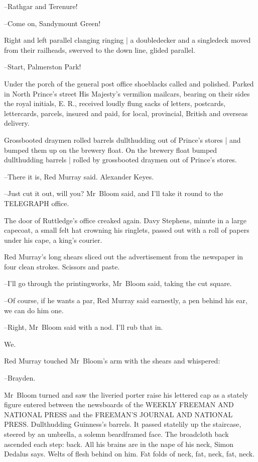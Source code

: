 --Rathgar and Terenure!

--Come on, Sandymount Green!

Right and left parallel clanging ringing |
a doubledecker and a singledeck moved from their railheads,
swerved to the down line,
glided parallel.

--Start, Palmerston Park!



Under the porch of the general post office
shoeblacks called and polished.
Parked in North Prince's street
His Majesty's vermilion mailcars,
bearing on their sides the royal initials, E. R.,
received loudly flung sacks
of letters, postcards, lettercards, parcels, insured and paid,
for local, provincial, British and overseas delivery.



Grossbooted draymen rolled barrels dullthudding
out of Prince's stores |
and bumped them up on the brewery float.
On the brewery float bumped dullthudding barrels |
rolled by grossbooted draymen out of Prince's stores.

--There it is,
Red Murray said.
Alexander Keyes.

--Just cut it out, will you?
Mr~Bloom said,
and I'll take it round to the TELEGRAPH office.

The door of Ruttledge's office creaked again.
Davy Stephens,
minute in a large capecoat,
a small felt hat crowning his ringlets,
passed out with a roll of papers under his cape,
a king's courier.

Red Murray's long shears sliced out the advertisement
from the newspaper in four clean strokes.
Scissors and paste.

--I'll go through the printingworks,
Mr~Bloom said,
taking the cut square.

--Of course, if he wants a par,
Red Murray said earnestly, a pen behind his ear,
we can do him one.

--Right,
Mr~Bloom said with a nod.
I'll rub that in.

We.



Red Murray touched Mr~Bloom's arm with the shears and whispered:

--Brayden.

Mr~Bloom turned and saw the liveried porter raise his lettered cap
as a stately figure entered between the newsboards
of the WEEKLY FREEMAN AND NATIONAL PRESS
and the FREEMAN'S JOURNAL AND NATIONAL PRESS.
Dullthudding Guinness's barrels.
It passed statelily up the staircase,
steered by an umbrella,
a solemn beardframed face.
The broadcloth back ascended each step: back.
All his brains are in the nape of his neck, Simon Dedalus says.
Welts of flesh behind on him.
Fat folds of neck, fat, neck, fat, neck.

